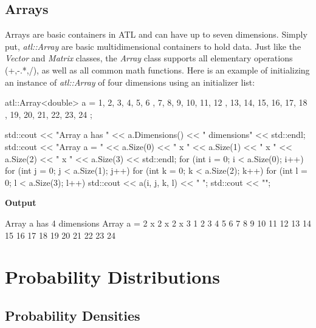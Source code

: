 \documentclass[12pt,a4paper]{article}
\begin{document}
\subsection{Arrays}
Arrays are basic containers in ATL and can have up to seven dimensions.   Simply put, \textit{atl::Array} are basic multidimensional containers to hold data. Just like the \textit{Vector} and \textit{Matrix} classes, the \textit{Array} class supports all elementary operations (+,-.*,/), as well as all common math functions. Here is an example of initializing an instance of \textit{atl::Array} of four dimensions using an initializer list:
\begin{cppsource}

  atl::Array<double> a = {
        {
            {
                {1, 2, 3},
                {4, 5, 6}
            },
            {
                {7, 8, 9},
                {10, 11, 12}
            }
        },
        {
            {
                {13, 14, 15},
                {16, 17, 18}
            },
            {
                {19, 20, 21},
                {22, 23, 24}
            }
        }
    };

    std::cout << "Array a has " << a.Dimensions() << " dimensions" << std::endl;
    std::cout << "Array a = " << a.Size(0) << " x " << a.Size(1) 
                  << " x " << a.Size(2) << " x " << a.Size(3) << std::endl;
    for (int i = 0; i < a.Size(0); i++) {
        for (int j = 0; j < a.Size(1); j++) {
            for (int k = 0; k < a.Size(2); k++) {
                for (int l = 0; l < a.Size(3); l++) {
                    std::cout << a(i, j, k, l) << " ";
                }
                std::cout << "\n";
            }
        }
    }
 \end{cppsource}   
 
 \textbf{Output} 
 
 \begin{myoutput}
 
Array a has 4 dimensions
Array a = 2 x 2 x 2 x 3
1 2 3 
4 5 6 
7 8 9 
10 11 12 
13 14 15 
16 17 18 
19 20 21 
22 23 24 
 

 \end{myoutput}



\section{Probability Distributions}
\subsection{Probability Densities}
\end{document}
